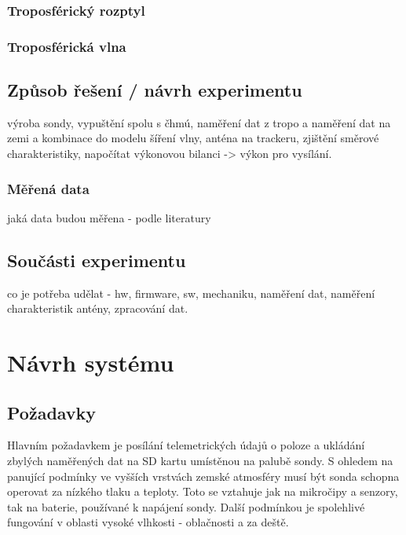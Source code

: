 \documentclass[twoside]{ctuthesis}
\theoremstyle{plain}
\theoremstyle{definition}
\theoremstyle{note}
\begin{document}
		\subsection{Troposférický rozptyl}
		\subsection{Troposférická vlna}

	\section{Způsob řešení / návrh experimentu}
	výroba sondy, vypuštění spolu s čhmú, naměření dat z tropo a naměření dat na zemi a kombinace do modelu šíření vlny, anténa na trackeru, zjištění směrové charakteristiky, napočítat výkonovou bilanci -> výkon pro vysílání.
		\subsection{Měřená data}	
		jaká data budou měřena - podle literatury

	\section{Součásti experimentu}
	co je potřeba udělat - hw, firmware, sw, mechaniku, naměření dat, naměření charakteristik antény, zpracování dat. 
	
















	

\chapter{Návrh systému}

	\section{Požadavky}
	Hlavním požadavkem je posílání telemetrických údajů o poloze a ukládání zbylých naměřených dat na SD kartu umístěnou na palubě sondy. S ohledem na panující podmínky ve vyšších vrstvách zemské atmosféry musí být sonda schopna operovat za nízkého tlaku a teploty. Toto se vztahuje jak na mikročipy a senzory, tak na baterie, používané k napájení sondy. Další podmínkou je spolehlivé fungování v oblasti vysoké vlhkosti - oblačnosti a za deště. 
\end{document}
